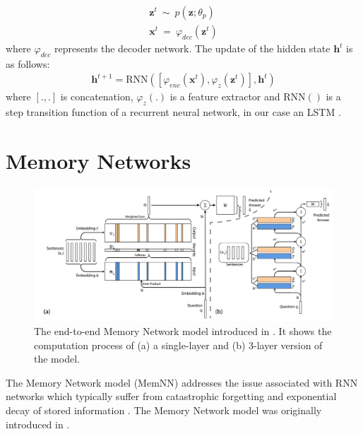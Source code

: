 \begin{equation}
\label{eq:x_infer}
\begin{gathered}
    \mathbf{z}^t~\mathtt{\sim}~p(\mathbf{z};\theta_{p})\\
    \mathbf{x}^t~=~ \varphi_{dec}(\mathbf{z}^t)
\end{gathered}
\end{equation}
where $\varphi_{dec}$ represents the decoder network.
The update of the hidden state $\mathbf{h}^t$ is as follows:
\begin{equation}
    \label{eq:hidden_update}
    \begin{gathered}
        \mathbf{h}^{t+1} = \text{RNN}([\varphi_{enc}(\mathbf{x}^t),\varphi_{z}(\mathbf{z}^t)], \mathbf{h}^t)
    \end{gathered}
\end{equation}
where $[.,.]$ is concatenation, $\varphi_z(.)$ is a feature extractor and $\text{RNN}()$ is a step transition function of a recurrent neural network, in our case an LSTM \cite{hochreiter1997}.

\section{Memory Networks}
\label{background:mem_nn}
\begin{figure}[t]
    \centering
    \includegraphics[width=\textwidth]{images/e2e_mem_nn.png}
    \caption{The end-to-end Memory Network model introduced in \citet{sukhbaatar2015end}. It shows the computation process of (a) a single-layer and (b) 3-layer version of the model. }
    \label{fig:e2e_memnn}
\end{figure}
The Memory Network model (MemNN) addresses the issue associated with RNN networks which typically suffer from catastrophic forgetting and exponential decay of stored information \cite{neil2016phased}.
The Memory Network model was originally introduced in \citet{DBLP:journals/corr/WestonCB14}.
